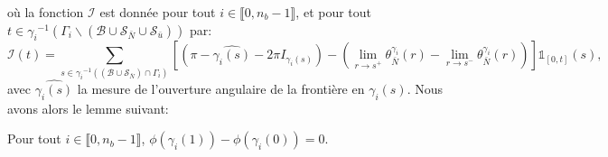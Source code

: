où la fonction $\mathcal{I}$ est donnée pour tout $i\in\llbracket0, n_b-1\rrbracket$, et pour tout $t\in{\gamma_i}^{-1}(\Gamma_i\backslash(\mathcal{B}\cup\mathcal{S}_{\bar{N}}\cup\mathcal{S}_{\bar{u}}))$ par:
$$
\mathcal{I}(t)=\sum_{s\in{\gamma_i}^{-1}((\mathcal{B}\cup\mathcal{S}_{\bar{N}})\cap\Gamma_i)}\left[\left(\pi-\widehat{\gamma_i(s)}-2\pi I_{\gamma_i(s)}\right)-\left(\lim\limits_{r\rightarrow s^+}\theta^{\gamma_i}_{\bar{N}}(r) - \lim\limits_{r\rightarrow s^-}\theta^{\gamma_i}_{\bar{N}}(r)\right)\right]\mathbb{1}_{[0, t]}(s),
$$
avec $\widehat{\gamma_i(s)}$ la mesure de l'ouverture angulaire de la frontière en $\gamma_i(s)$. Nous avons alors le lemme suivant:

\begin{lemma}
    Pour tout $i\in\llbracket0, n_b-1\rrbracket$, $\phi(\gamma_i(1))-\phi(\gamma_i(0))=0$.
    \label{lem:marvelous_lemma_second}
\end{lemma}
